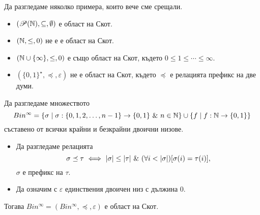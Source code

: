 \begin{example}
  Да разгледаме няколко примера, които вече сме срещали.
  \begin{itemize}
  \item
    $(\mathscr{P}(\mathbb{N}),\subseteq,\emptyset)$ е област на Скот.
  \item
    $(\mathbb{N}, \leq, 0)$ не е е област на Скот.
  \item
    $(\mathbb{N}\cup\{\infty\}, \leq, 0)$ е също област на Скот, където $0 \leq 1 \leq \cdots \leq \infty$.
  \item
    $(\{0,1\}^\star, \preceq, \varepsilon)$ не е област на Скот, където $\preceq$ е релацията префикс на две думи.
  \end{itemize}
\end{example}

\begin{example}
  Да разгледаме множеството 
  \[Bin^\infty = \{\sigma \mid \sigma :\{0,1,2,\dots,n-1\} \to \{0,1\}\ \&\ n \in \mathbb{N}\} \cup 
  \{f \mid f:\mathbb{N} \to \{0,1\}\}\]
  съставено от всички крайни и безкрайни двоични низове.
  \begin{itemize}
  \item
    Да разгледаме релацията
    \[\sigma \preceq \tau \ \Longleftrightarrow\  \vert{\sigma}\vert \leq \vert{\tau}\vert\ \&\ (\forall i < |\sigma|)[\sigma(i) = \tau(i)],\]
    $\sigma$ е префикс на $\tau$.    
  \item
    Да означим с $\varepsilon$ единствения двоичен низ с дължина $0$.
  \end{itemize}
  Тогава $Bin^\infty = (Bin^\infty,\preceq,\varepsilon)$ е област на Скот.
\end{example}

